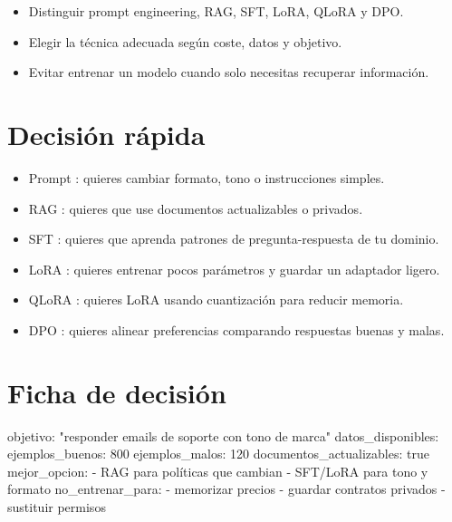 \documentclass[11pt,a4paper]{book}
\begin{document}
\begin{itemize}\item Distinguir prompt engineering, RAG, SFT, LoRA, QLoRA y DPO.\end{itemize}
\begin{itemize}\item Elegir la técnica adecuada según coste, datos y objetivo.\end{itemize}
\begin{itemize}\item Evitar entrenar un modelo cuando solo necesitas recuperar información.\end{itemize}
\section{Decisión rápida}
\begin{itemize}\item Prompt : quieres cambiar formato, tono o instrucciones simples.\end{itemize}
\begin{itemize}\item RAG : quieres que use documentos actualizables o privados.\end{itemize}
\begin{itemize}\item SFT : quieres que aprenda patrones de pregunta-respuesta de tu dominio.\end{itemize}
\begin{itemize}\item LoRA : quieres entrenar pocos parámetros y guardar un adaptador ligero.\end{itemize}
\begin{itemize}\item QLoRA : quieres LoRA usando cuantización para reducir memoria.\end{itemize}
\begin{itemize}\item DPO : quieres alinear preferencias comparando respuestas buenas y malas.\end{itemize}
\section{Ficha de decisión}
\begin{codebox}
objetivo: "responder emails de soporte con tono de marca"
datos_disponibles:
  ejemplos_buenos: 800
  ejemplos_malos: 120
  documentos_actualizables: true
mejor_opcion:
  - RAG para políticas que cambian
  - SFT/LoRA para tono y formato
no_entrenar_para:
  - memorizar precios
  - guardar contratos privados
  - sustituir permisos
\end{codebox}
\end{document}
